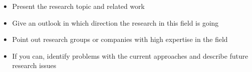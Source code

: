 \begin{itemize}
    \item Present the research topic and related work 
    \item Give an outlook in which direction the research in this field is going
    \item Point out research groups or companies with high expertise in the field
    \item If you can, identify problems with the current approaches and describe 
        future research issues
\end{itemize}